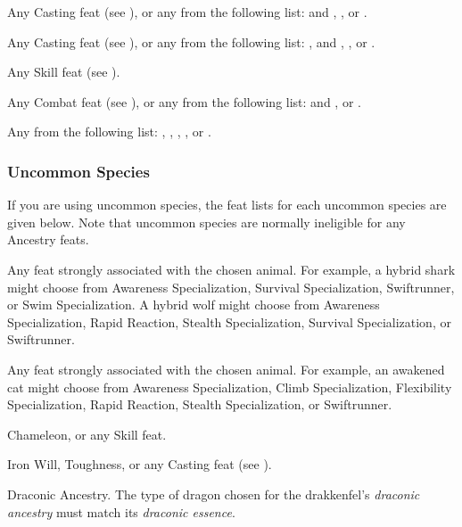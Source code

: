          Any Casting feat (see ), or any from the following list:  and , , or .

         Any Casting feat (see ), or any from the following list: ,  and , , or .

         Any Skill feat (see ).

         Any Combat feat (see ), or any from the following list:  and , or .

         Any from the following list: , , , , or .

        \subsubsection{Uncommon Species}
            If you are using uncommon species, the feat lists for each uncommon species are given below.
            Note that uncommon species are normally ineligible for any Ancestry feats.

             Any feat strongly associated with the chosen animal. For example, a hybrid shark might choose from Awareness Specialization, Survival Specialization, Swiftrunner, or Swim Specialization. A hybrid wolf might choose from Awareness Specialization, Rapid Reaction, Stealth Specialization, Survival Specialization, or Swiftrunner.

             Any feat strongly associated with the chosen animal. For example, an awakened cat might choose from Awareness Specialization, Climb Specialization, Flexibility Specialization, Rapid Reaction, Stealth Specialization, or Swiftrunner.

             Chameleon, or any Skill feat.

             Iron Will, Toughness, or any Casting feat (see ).

             Draconic Ancestry. The type of dragon chosen for the drakkenfel's \textit{draconic ancestry} must match its \textit{draconic essence}.


